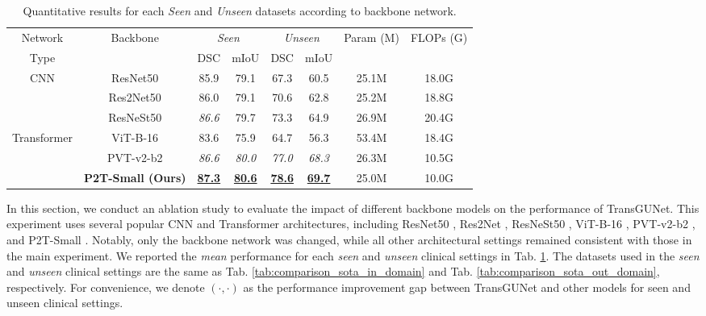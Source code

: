 \begin{table}[h]
    \centering
    \scriptsize
    \setlength\tabcolsep{2.0pt} %
    \begin{tabular}{c|c|cc|cc|c|c}
    \hline
    Network & \multicolumn{1}{c|}{\multirow{2}{*}{Backbone}} & \multicolumn{2}{c|}{\textit{Seen}}  & \multicolumn{2}{c|}{\textit{Unseen}} & \multicolumn{1}{c|}{\multirow{2}{*}{Param (M)}}  & \multicolumn{1}{c}{\multirow{2}{*}{FLOPs (G)}} \\ \cline{3-6}
    Type    & & DSC & mIoU & DSC & mIoU & & \\
    \hline
    \multicolumn{1}{c|}{\multirow{3}{*}{CNN}} & ResNet50 & 85.9 & 79.1 & 67.3 & 60.5 & 25.1M & 18.0G \\
     & Res2Net50 & 86.0 & 79.1 & 70.6 & 62.8 & 25.2M & 18.8G \\
     & ResNeSt50 & \textit{86.6} & 79.7 & 73.3 & 64.9 & 26.9M & 20.4G \\
     \hline
    \multicolumn{1}{c|}{\multirow{3}{*}{Transformer}} & ViT-B-16 & 83.6 & 75.9 & 64.7 & 56.3 & 53.4M & 18.4G \\
     & PVT-v2-b2 & \textit{86.6} & \textit{80.0} & \textit{77.0} & \textit{68.3} & 26.3M & 10.5G \\
     & \textbf{P2T-Small \tiny{(Ours)}} & \textbf{\underline{87.3}} & \textbf{\underline{80.6}} & \textbf{\underline{78.6}} & \textbf{\underline{69.7}} & 25.0M & 10.0G \\
     \hline
    \end{tabular}
    \caption{Quantitative results for each \textit{Seen} and \textit{Unseen} datasets according to backbone network.}
    \label{tab:ablation_backbone_networks}
\end{table}

In this section, we conduct an ablation study to evaluate the impact of different backbone models on the performance of TransGUNet. This experiment uses several popular CNN and Transformer architectures, including ResNet50 \cite{he2016deep}, Res2Net \cite{gao2019res2net}, ResNeSt50 \cite{zhang2022resnest}, ViT-B-16 \cite{dosovitskiy2021an}, PVT-v2-b2 \cite{wang2022pvt}, and P2T-Small \cite{wu2022p2t}. Notably, only the backbone network was changed, while all other architectural settings remained consistent with those in the main experiment. We reported the \textit{mean} performance for each \textit{seen} and \textit{unseen} clinical settings in Tab. \ref{tab:ablation_backbone_networks}. The datasets used in the \textit{seen} and \textit{unseen} clinical settings are the same as Tab. \ref{tab:comparison_sota_in_domain} and Tab. \ref{tab:comparison_sota_out_domain}, respectively. For convenience, we denote $( \cdot, \cdot )$ as the performance improvement gap between TransGUNet and other models for seen and unseen clinical settings.


